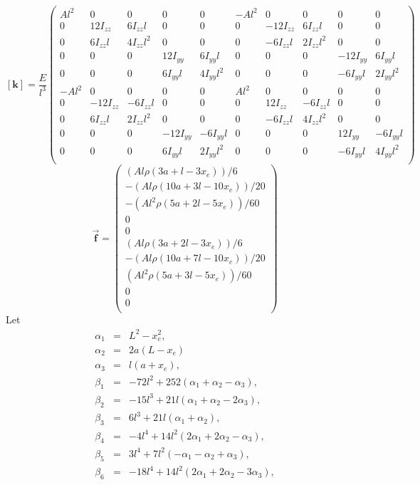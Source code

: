 \[
\mathbf{[k]} = 
\frac{E}{l^3}\begin{pmatrix}
  Al^2 &  0 &    0 &  0 &    0 & -Al^2 &   0 &    0 &   0 &    0\\
 0 &  12I_{zz} &   6I_{zz}l &  0 &    0 & 0 &  -12I_{zz} &   6I_{zz}l &   0 &    0\\
 0 & 6I_{zz}l & 4I_{zz}l^2 &  0 &    0 & 0 & -6I_{zz}l & 2I_{zz}l^2 &   0 &    0\\
 0 &  0 &    0 &  12I_{yy} &   6I_{yy}l & 0 &   0 &    0 &  -12I_{yy} &   6I_{yy}l\\
 0 &  0 &    0 & 6I_{yy}l & 4I_{yy}l^2 & 0 &   0 &    0 & -6I_{yy}l & 2I_{yy}l^2\\
 -Al^2 &  0 &    0 &  0 &    0 &  Al^2 &   0 &    0 &   0 &    0\\
 0 & -12I_{zz} &  -6I_{zz}l &  0 &    0 & 0 &   12I_{zz} &  -6I_{zz}l &   0 &    0\\
 0 & 6I_{zz}l & 2I_{zz}l^2 &  0 &    0 & 0 & -6I_{zz}l & 4I_{zz}l^2 &   0 &    0\\
 0 &  0 &    0 & -12I_{yy} &  -6I_{yy}l & 0 &   0 &    0 &   12I_{yy} &  -6I_{yy}l\\
 0 &  0 &    0 & 6I_{yy}l & 2I_{yy}l^2 & 0 &   0 &    0 & -6I_{yy}l & 4I_{yy}l^2\\
\end{pmatrix}
\]
\[
	\vec{\mathbf{f}} =
\begin{pmatrix}
	      (Al\rho(3a + l - 3x_e))/6\\
     -(Al\rho(10a + 3l - 10x_e))/20\\
     -(Al^2\rho(5a + 2l - 5x_e))/60\\
                                  0\\
                                  0\\
         (Al\rho(3a + 2l - 3x_e))/6\\
     -(Al\rho(10a + 7l - 10x_e))/20\\
      (Al^2\rho(5a + 3l - 5x_e))/60\\
                                  0\\
                                  0\\
\end{pmatrix}	 
\]
Let 
\begin{eqnarray*}
\alpha_1 &=& L^2-x_e^2,\\
\alpha_2 &=& 2a(L-x_e)\\
\alpha_3 &=& l(a+x_e),\\
\beta_1 &=& -72l^2+252(\alpha_1+\alpha_2-\alpha_3),\\
\beta_2 &=& -15l^3+21l(\alpha_1+\alpha_2-2\alpha_3),\\
\beta_3 &=& 6l^3+21l(\alpha_1+\alpha_2),\\
\beta_4 &=& -4l^4+14l^2(2\alpha_1+2\alpha_2-\alpha_3),\\
\beta_5 &=& 3l^4+7l^2(-\alpha_1-\alpha_2+\alpha_3),\\
\beta_6 &=& -18l^4+14l^2(2\alpha_1+2\alpha_2-3\alpha_3),
\end{eqnarray*}
